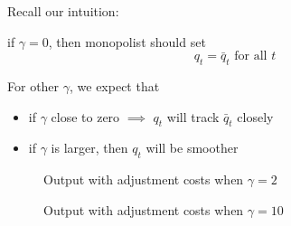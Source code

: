 \begin{frame}
    
    Recall our intuition: 
    
        \vspace{0.5em}
        \vspace{0.5em}
    if $\gamma = 0$, then monopolist should set
    \begin{equation*}
        q_t = \bar q_t \text{ for all } t
    \end{equation*}

        \vspace{0.5em}
        \vspace{0.5em}
        \vspace{0.5em}
    For other $\gamma$, we expect that
    \begin{itemize}
        \item if $\gamma$ close to zero $\implies$ $q_t$ will track $\bar q_t$ closely
        \vspace{0.5em}
        \item if $\gamma$ is larger, then $q_t$ will be smoother 
    \end{itemize}


\end{frame}



\begin{frame}
    
    \begin{figure}
       \centering
       \caption{\label{f:monopolist_adj_costs_1} Output with adjustment costs when $\gamma = 2$}
    \end{figure}


\end{frame}

\begin{frame}
    
    \begin{figure}
       \centering
       \caption{\label{f:monopolist_adj_costs_2} Output with adjustment costs when $\gamma = 10$}
    \end{figure}

\end{frame}



